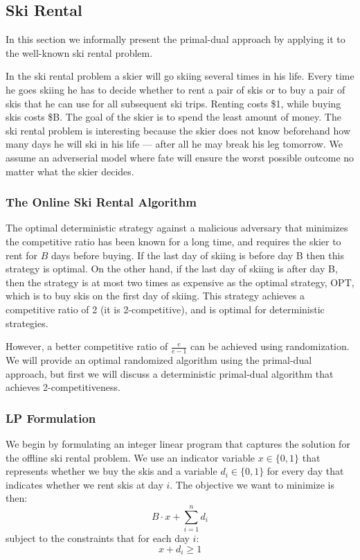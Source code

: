 \subsection{Ski Rental}

In this section we informally present the primal-dual approach by applying it to the well-known ski rental problem.

In the ski rental problem a skier will go skiing several times in his life.
Every time he goes skiing he has to decide whether to rent a pair of skis or to buy a pair of skis that he can use for all subsequent ski trips.
Renting costs \$1, while buying skis costs \$B.
The goal of the skier is to spend the least amount of money.
The ski rental problem is interesting because the skier does not know beforehand how many days he will ski in his life --- after all he may break his leg tomorrow.
We assume an adverserial model where fate will ensure the worst possible outcome no matter what the skier decides.

\subsubsection{The Online Ski Rental Algorithm}
The optimal deterministic strategy against a malicious adversary that minimizes the competitive ratio has been known for a long time, and requires the skier to rent for $B$ days before buying.
If the last day of skiing is before day B then this strategy is optimal.
On the other hand, if the last day of skiing is after day B, then the strategy is at most two times as expensive as the optimal strategy, OPT, which is to buy skis on the first day of skiing.
This strategy achieves a competitive ratio of 2 (it is 2-competitive), and is optimal for deterministic strategies.

However, a better competitive ratio of $\frac{e}{e-1}$ can be achieved using randomization.
We will provide an optimal randomized algorithm using the primal-dual approach, but first we will discuss a deterministic primal-dual algorithm that achieves 2-competitiveness.

\subsubsection{LP Formulation}
We begin by formulating an integer linear program that captures the solution for the offline ski rental problem.
We use an indicator variable $x \in \{0,1\}$ that represents whether we buy the skis and a variable $d_i \in \{0,1\}$ for every day that indicates whether we rent skis at day $i$. 
The objective we want to minimize is then:
\[ B\cdot x + \sum^n_{i=1} d_i \]
subject to the constraints that for each day $i$:
\[ x + d_i \ge 1 \]

